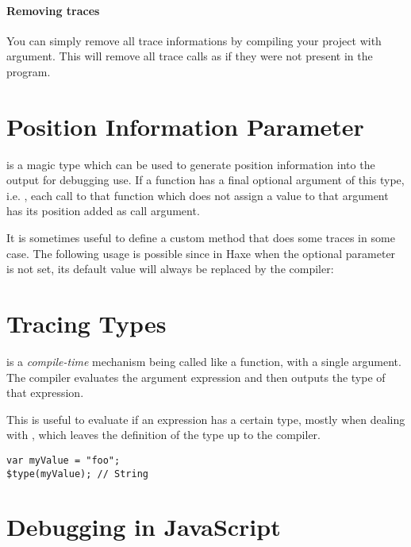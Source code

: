 \paragraph{Removing traces}

You can simply remove all trace informations by compiling your project with  argument. This will remove all trace calls as if they were not present in the program.

\section{Position Information Parameter}
\label{debugging-posinfos}

\href{http://api.haxe.org/haxe/PosInfos.html}{} is a magic type which can be used to generate position information into the output for debugging use.
If a function has a final optional argument of this type, i.e. , each call to that function which does not assign a value to that argument has its position added as call argument. 

It is sometimes useful to define a custom method that does some traces in some case. The following usage is possible since in Haxe when the  optional parameter is not set, its default value will always be replaced by the compiler:


\section{Tracing Types}
\label{debugging-type-function}

 is a \emph{compile-time} mechanism being called like a function, with a single argument. The compiler evaluates the argument expression and then outputs the type of that expression.

This is useful to evaluate if an expression has a certain type, mostly when dealing with , which leaves the definition of the type up to the compiler.

\begin{lstlisting}
var myValue = "foo";
$type(myValue); // String
\end{lstlisting}


\section{Debugging in JavaScript}
\label{debugging-javascript}

